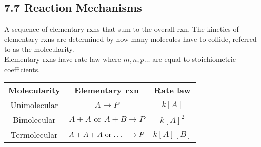 \subsection{7.7 Reaction Mechanisms}
    A sequence of elementary rxns that sum to the overall rxn. The kinetics of elementary rxns are determined by
    how many molecules have to collide, referred to as the molecularity.\\
    

    Elementary rxns have rate law where $m,n,p\dots$ are equal to stoichiometric coefficients.
    \vspace*{0.5em}
    
    \begin{center}
        \begin{tabular}{ |c|c|c| } 
         \hline
         \textbf{Molecularity} & \textbf{Elementary rxn} & \textbf{Rate law} \\
         Unimolecular & $A \longrightarrow P$ & $k[A]$ \\
         Bimolecular & $A + A \textrm{ or } A + B \longrightarrow P$ & $k[A]^2$ \\
         Termolecular & $A + A + A \textrm{ or \dots} \longrightarrow P$ & $k[A][B]$ \\
         \hline
        \end{tabular}
    \end{center}